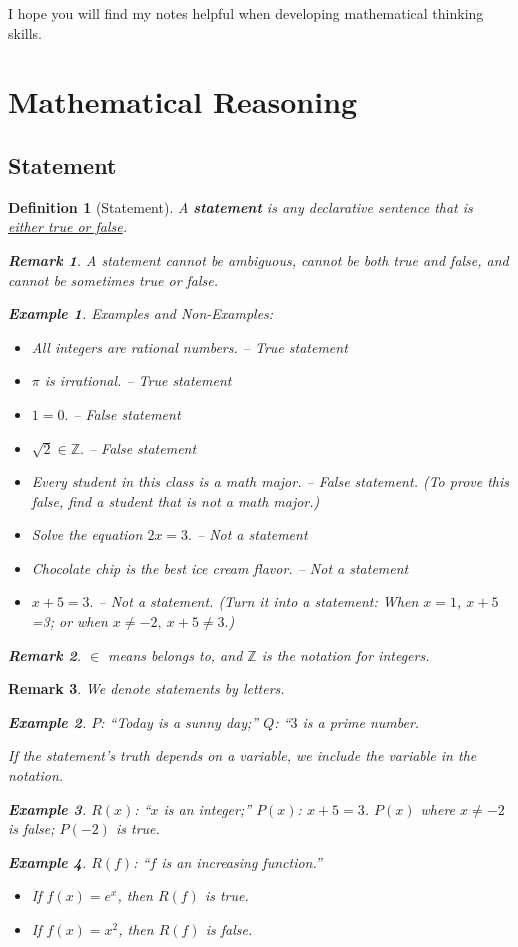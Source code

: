\documentclass[12pt,a4paper]{article}
\newtheorem{df}{Definition}[subsection]
\newtheorem{eg}{Example}[subsection]
\newtheorem*{rmk}{\indent Remark}
\def\Z{{\mathbb{Z}}}
\begin{document}
I hope you will find my notes helpful when developing mathematical thinking skills.


\newpage
\section{Mathematical Reasoning}
\subsection{Statement}
\begin{df}[Statement]
	A \textbf{statement} is any declarative sentence that is \underline{either true or false}.
	\begin{rmk}
		A statement cannot be ambiguous, cannot be both true and false, and cannot be sometimes true or false.
	\end{rmk}
	\begin{eg}
		Examples and Non-Examples: 
		\begin{itemize}
			\item All integers are rational numbers. -- True statement
			\item $\pi$ is irrational. -- True statement
			\item $1=0.$ -- False statement
			\item $\sqrt{2}\in\Z.$ -- False statement
			\item Every student in this class is a math major. -- False statement. (To prove this false, find a student that is not a math major.)
			\item Solve the equation $2x=3.$ -- Not a statement
			\item Chocolate chip is the best ice cream flavor. -- Not a statement
			\item $x+5=3.$ -- Not a statement. (Turn it into a statement: When $x=1$, $x+5$=3; or when $x\neq-2,\ x+5\neq3.$)
		\end{itemize}
		\begin{rmk}
			$\in$ means belongs to, and $\Z$ is the notation for integers.	
		\end{rmk}
	\end{eg}
\end{df}
\begin{rmk} 
	We denote statements by letters. 
	\begin{eg}
		$P$: ``Today is a sunny day;'' $Q$: ``$3$ is a prime number.	
	\end{eg}
	If the statement's truth depends on a variable, we include the variable in the notation.
	\begin{eg}
		$R(x)$: ``$x$ is an integer;'' $P(x)$: $x+5=3$. $P(x)$ where $x\neq-2$ is false; $P(-2)$ is true.	
	\end{eg}
	\begin{eg}
		$R(f)$: ``$f$ is an increasing function.''
		\begin{itemize}
			\item If $f(x)=e^x$, then $R(f)$ is true.
			\item If $f(x)=x^2$, then $R(f)$ is false.
		\end{itemize}	
	\end{eg}
\end{rmk}
\end{document}
